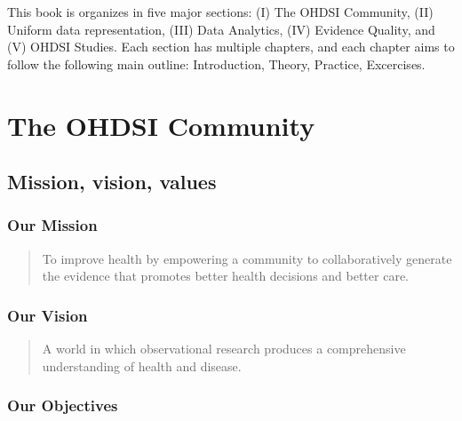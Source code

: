 \documentclass[]{book}
\begin{document}
This book is organizes in five major sections: (I) The OHDSI Community,
(II) Uniform data representation, (III) Data Analytics, (IV) Evidence
Quality, and (V) OHDSI Studies. Each section has multiple chapters, and
each chapter aims to follow the following main outline: Introduction,
Theory, Practice, Excercises.

\part{The OHDSI Community}\label{part-the-ohdsi-community}

\chapter{Mission, vision, values}\label{MissionVissionValues}

\section{Our Mission}\label{our-mission}

\begin{quote}
To improve health by empowering a community to collaboratively generate
the evidence that promotes better health decisions and better care.
\end{quote}

\section{Our Vision}\label{our-vision}

\begin{quote}
A world in which observational research produces a comprehensive
understanding of health and disease.
\end{quote}

\section{Our Objectives}\label{our-objectives}
\end{document}
